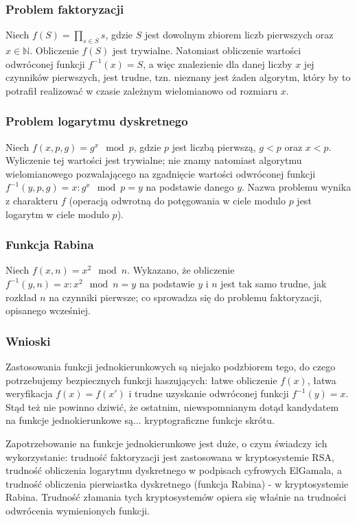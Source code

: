\documentclass[12pt,a4paper,twoside]{article}
\begin{document}
\subsubsection{Problem faktoryzacji}
Niech $f(S) = \prod_{s \in S} s$, gdzie $S$ jest dowolnym zbiorem liczb
pierwszych oraz $x \in \mathbb{N}$. Obliczenie $f(S)$ jest trywialne. Natomiast
obliczenie wartości odwróconej funkcji $f^{-1}(x)=S$, a więc znalezienie dla
danej liczby $x$ jej czynników pierwszych, jest trudne, tzn. nieznany jest
żaden algorytm, który by to potrafił realizować w czasie zależnym wielomianowo
od rozmiaru $x$.

\subsubsection{Problem logarytmu dyskretnego}
Niech $f(x, p, g) = g^x \mod p$, gdzie $p$ jest liczbą pierwszą, $g < p$ oraz
$x < p$. Wyliczenie tej wartości jest trywialne; nie znamy natomiast algorytmu
wielomianowego pozwalającego na zgadnięcie wartości odwróconej funkcji
\mbox{$f^{-1}(y, p, g) = x : g^x \mod p = y$} na podstawie danego $y$. Nazwa problemu
wynika z charakteru $f$ (operacją odwrotną do potęgowania w ciele modulo $p$
jest logarytm w ciele modulo $p$).

\subsubsection{Funkcja Rabina}
Niech $f(x,n) = x^2 \mod n$. Wykazano, że obliczenie $f^{-1}(y,n) = x : x^2
\mod n = y$ na podstawie $y$ i $n$ jest tak samo trudne, jak rozkład $n$ na
czynniki pierwsze; co sprowadza się do problemu faktoryzacji, opisanego
wcześniej.

\subsubsection{Wnioski}
Zastosowania funkcji jednokierunkowych są niejako podzbiorem tego, do czego
potrzebujemy bezpiecznych funkcji haszujących: łatwe obliczenie $f(x)$, łatwa
weryfikacja $f(x)=f(x')$ i trudne uzyskanie odwróconej funkcji $f^{-1}(y)=x$.
Stąd też nie powinno dziwić, że ostatnim, niewspomnianym dotąd kandydatem na
funkcje jednokierunkowe są... kryptograficzne funkcje skrótu.

Zapotrzebowanie na funkcje jednokierunkowe jest duże, o czym świadczy ich
wykorzystanie: trudność faktoryzacji jest zastosowana w kryptosystemie RSA,
trudność obliczenia logarytmu dyskretnego w podpisach cyfrowych ElGamala, a
trudność obliczenia pierwiastka dyskretnego (funkcja Rabina) - w kryptosystemie
Rabina. Trudność złamania tych kryptosystemów opiera się właśnie na trudności
odwrócenia wymienionych funkcji.
\end{document}
